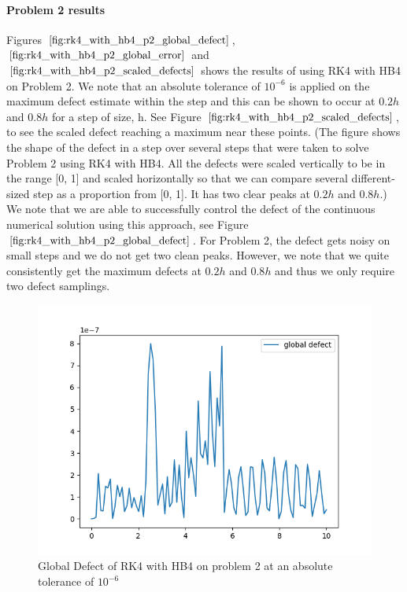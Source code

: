 \documentclass{article}
\begin{document}
\paragraph{Problem 2 results}
Figures $\ref{fig:rk4_with_hb4_p2_global_defect}$, $\ref{fig:rk4_with_hb4_p2_global_error}$ and $\ref{fig:rk4_with_hb4_p2_scaled_defects}$ shows the results of using RK4 with HB4 on Problem 2. We note that an absolute tolerance of $10^{-6}$ is applied on the maximum defect estimate within the step and this can be shown to occur at $0.2h$ and $0.8h$ for a step of size, h. See Figure $\ref{fig:rk4_with_hb4_p2_scaled_defects}$, to see the scaled defect reaching a maximum near these points. (The figure shows the shape of the defect in a step over several steps that were taken to solve Problem 2 using RK4 with HB4. All the defects were scaled vertically to be in the range [0, 1] and scaled horizontally so that we can compare several different-sized step as a proportion from [0, 1]. It has two clear peaks at $0.2h$ and $0.8h$.) We note that we are able to successfully control the defect of the continuous numerical solution using this approach, see Figure $\ref{fig:rk4_with_hb4_p2_global_defect}$. For Problem 2, the defect gets noisy on small steps and we do not get two clean peaks. However, we note that we quite consistently get the maximum defects at $0.2h$ and $0.8h$ and thus we only require two defect samplings.

\begin{figure}[H]
\centering
\includegraphics[width=0.7\linewidth]{./figures/rk4_with_hb4_p2_global_defect}
\caption{Global Defect of RK4 with HB4 on problem 2 at an absolute tolerance of $10^{-6}$}
\label{fig:rk4_with_hb4_p2_global_defect}
\end{figure}
\end{document}
